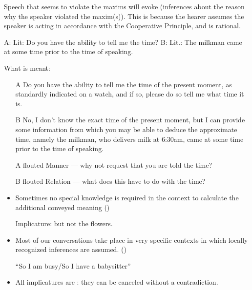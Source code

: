 \documentclass[a4paper,landscape,headrule,footrule,xetex]{foils}
\begin{document}

Speech that seems to violate the maxims will evoke 
(inferences about the reason why the speaker violated the maxim(s)).
This is because the hearer assumes the speaker is acting in accordance
with the Cooperative Principle, and is rational.
\begin{exe}
  \ex A: 
  \trans Lit: Do you have the ability to tell me the time?
  \ex B: 
  \trans Lit.: The milkman came at some time prior to the time of speaking.
\end{exe}
\newpage
What is meant:
\begin{itemize}
\item [A] Do you have the ability to tell me the time of the present moment, as standardly indicated on a watch, and if so, please do so tell me what time it is.
\item [B] No, I don't know the exact time of the present moment, but I can provide some information from which you may be able to deduce the approximate time, namely the milkman, who delivers milk at 6:30am,  came at some time prior to the time of speaking.
\end{itemize}

\begin{itemize}
\item [A] flouted Manner --- why not request that you are told the time?
\item [B] flouted Relation --- what does this have to do with the time?
\end{itemize}

\begin{itemize}
\item Sometimes no special knowledge is required in the context to
  calculate the additional conveyed meaning 
  ()
  \begin{exe}
    \ex {}
    \ex {}
    \trans \textnormal{Implicature: but not the flowers.}
  \end{exe}
\item 
Most of our conversations take place in very specific contexts in
which locally recognized inferences are assumed. 
()

\begin{exe}
  \ex {}
  \ex {} ``So I am busy/So I have a babysitter''
\end{exe}
\item All implicatures are : they can be canceled
without a contradiction.

\begin{exe}
  \ex {}
\end{exe}
\end{itemize}
\end{document}
